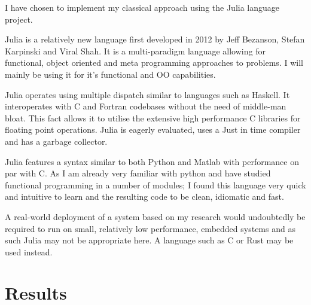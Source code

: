 I have chosen to implement my classical approach using the Julia language project\cite{JuliaProgrammingLanguage}.

Julia is a relatively new language first developed in 2012 by Jeff Bezanson, Stefan Karpinski and Viral Shah. It is a multi-paradigm language allowing for functional, object oriented and meta programming approaches to problems. I will mainly be using it for it's functional and OO capabilities. 

Julia operates using multiple dispatch similar to languages such as Haskell. It interoperates with C and Fortran codebases without the need of middle-man bloat. This fact allows it to utilise the extensive high performance C libraries for floating point operations. Julia is eagerly evaluated, uses a Just in time compiler and has a garbage collector.

Julia features a syntax similar to both Python and Matlab with performance on par with C. As I am already very familiar with python and have studied functional programming in a number of modules; I found this language very quick and intuitive to learn and the resulting code to be clean, idiomatic and fast.

A real-world deployment of a system based on my research would undoubtedly be required to run on small, relatively low performance, embedded systems and as such Julia may not be appropriate here. A language such as C or Rust may be used instead.
\section{Results}


